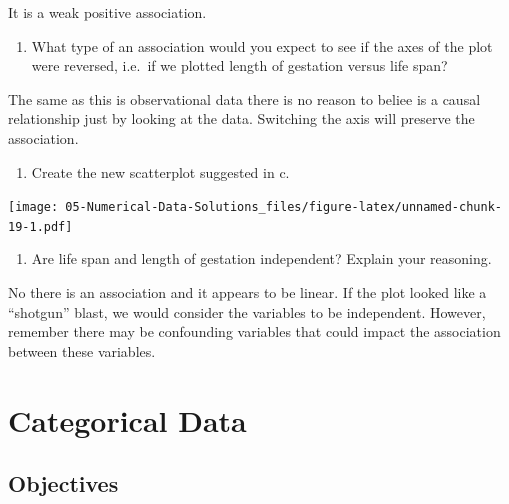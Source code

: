 \documentclass[
]{book}
\newenvironment{Shaded}{\begin{snugshade}}{\end{snugshade}}
\newcommand{\KeywordTok}[1]{\textcolor[rgb]{0.13,0.29,0.53}{\textbf{#1}}}
\newcommand{\NormalTok}[1]{#1}
\newcommand{\OperatorTok}[1]{\textcolor[rgb]{0.81,0.36,0.00}{\textbf{#1}}}
\providecommand{\tightlist}{%
  \setlength{\itemsep}{0pt}\setlength{\parskip}{0pt}}
\begin{document}
It is a weak positive association.

\begin{enumerate}
\def\labelenumi{\alph{enumi}.}
\setcounter{enumi}{2}
\tightlist
\item
  What type of an association would you expect to see if the axes of the plot were reversed, i.e.~if we plotted length of gestation versus life span?
\end{enumerate}

The same as this is observational data there is no reason to beliee is a causal relationship just by looking at the data. Switching the axis will preserve the association.

\begin{enumerate}
\def\labelenumi{\alph{enumi}.}
\setcounter{enumi}{3}
\tightlist
\item
  Create the new scatterplot suggested in c.~
\end{enumerate}

\begin{Shaded}
\end{Shaded}

\texttt{[image: 05-Numerical-Data-Solutions\_files/figure-latex/unnamed-chunk-19-1.pdf]}

\begin{enumerate}
\def\labelenumi{\alph{enumi}.}
\setcounter{enumi}{4}
\tightlist
\item
  Are life span and length of gestation independent? Explain your reasoning.
\end{enumerate}

No there is an association and it appears to be linear. If the plot looked like a ``shotgun'' blast, we would consider the variables to be independent. However, remember there may be confounding variables that could impact the association between these variables.

\hypertarget{CATDATA}{%
\chapter{Categorical Data}\label{CATDATA}}

\hypertarget{objectives-5}{%
\section{Objectives}\label{objectives-5}}
\end{document}
